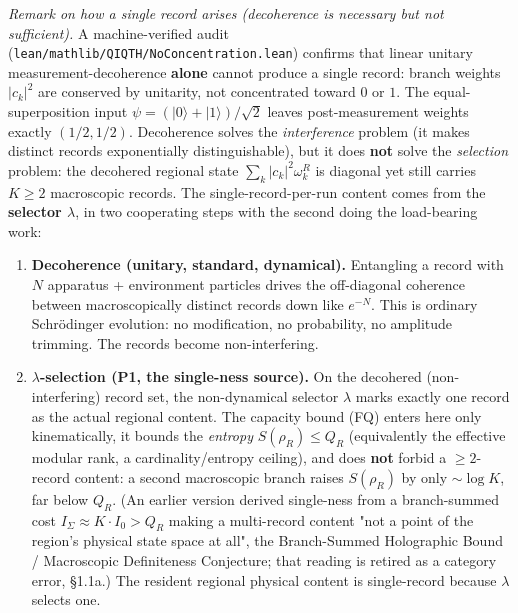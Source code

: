 \documentclass[11pt,a4paper]{article}
\begin{document}
\emph{Remark on how a single record arises (decoherence is necessary but not sufficient).} A machine-verified audit (\texttt{lean/mathlib/QIQTH/NoConcentration.lean}) confirms that linear unitary measurement-decoherence \textbf{alone} cannot produce a single record: branch weights $|c_k|^2$ are conserved by unitarity, not concentrated toward $0$ or $1$. The equal-superposition input $\psi = (|0\rangle + |1\rangle)/\sqrt{2}$ leaves post-measurement weights exactly $(1/2, 1/2)$. Decoherence solves the \emph{interference} problem (it makes distinct records exponentially distinguishable), but it does \textbf{not} solve the \emph{selection} problem: the decohered regional state $\sum_k |c_k|^2 \omega_k^R$ is diagonal yet still carries $K \ge 2$ macroscopic records. The single-record-per-run content comes from the \textbf{selector $\lambda$}, in two cooperating steps with the second doing the load-bearing work:

\begin{enumerate}
  \item \textbf{Decoherence (unitary, standard, dynamical).} Entangling a record with $N$ apparatus + environment particles drives the off-diagonal coherence between macroscopically distinct records down like $e^{-N}$. This is ordinary Schrödinger evolution: no modification, no probability, no amplitude trimming. The records become non-interfering.
  \item \textbf{$\lambda$-selection (P1, the single-ness source).} On the decohered (non-interfering) record set, the non-dynamical selector $\lambda$ marks exactly one record as the actual regional content. The capacity bound (FQ) enters here only kinematically, it bounds the \emph{entropy} $S(\rho_R) \le Q_R$ (equivalently the effective modular rank, a cardinality/entropy ceiling), and does \textbf{not} forbid a $\ge 2$-record content: a second macroscopic branch raises $S(\rho_R)$ by only $\sim\!\log K$, far below $Q_R$. (An earlier version derived single-ness from a branch-summed cost $I_\Sigma \approx K\cdot I_0 > Q_R$ making a multi-record content "not a point of the region's physical state space at all", the Branch-Summed Holographic Bound / Macroscopic Definiteness Conjecture; that reading is retired as a category error, §1.1a.) The resident regional physical content is single-record because $\lambda$ selects one.
\end{enumerate}
\end{document}
